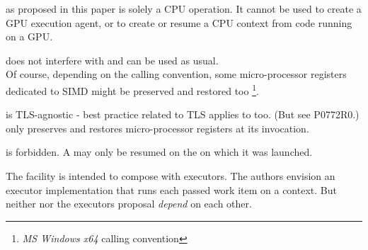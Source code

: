 \newpage
{}


\cc as proposed in this paper is solely a CPU operation. It cannot be used to
create a GPU execution agent, or to create or resume a CPU context from code
running on a GPU.



does not interfere with \cc and can be used as usual.\\

Of course, depending on the calling convention, some micro-processor registers
dedicated to SIMD might be preserved and restored too
\footnote{\emph{MS Windows x64} calling convention}.



\cc is TLS-agnostic - best practice related to TLS applies to \cc too. (But
see P0772R0.)\\

\cc only preserves and restores micro-processor registers at its invocation.



is forbidden. A \cont may only be resumed on the  on which it
was launched.


The \cc facility is intended to compose with executors. The authors envision
an executor implementation that runs each passed work item on a \cc context.
But neither \cc nor the executors proposal \emph{depend} on each other.
